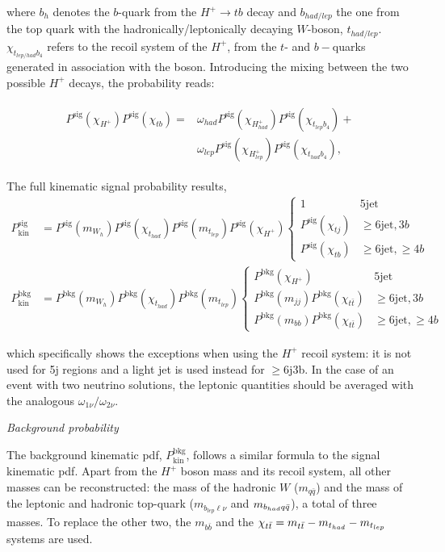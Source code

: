 where $b_h$ denotes the $b$-quark from the $H^+\to tb$ decay and $b_{had/lep}$ the one from the top quark with the hadronically/leptonically decaying $W$-boson, $t_{had/lep}$. $\chi_{t_{lep/had}b_4}$ refers to the recoil system of the $H^+$, from the $t$- and $b-$quarks generated in association with the boson.
Introducing the mixing between the two possible $H^+$ decays, the probability reads:

\begin{align}
    \begin{split}
        P^{\text{sig}}(\chi_{H^+})P^{\text{sig}}(\chi_{tb})=&\omega_{had}P^{\text{sig}}(\chi_{H^+_{had}})P^{\text{sig}}(\chi_{t_{lep}b_4})+\\
        &\omega_{lep}P^{\text{sig}}(\chi_{H^+_{lep}})P^{\text{sig}}(\chi_{t_{had}b_4}),
    \end{split}
\end{align}

The full kinematic signal probability results,
\begin{align}
    P_{\text{kin}}^{\text{sig}}&=P^{\text{sig}}(m_{W_h})P^{\text{sig}}(\chi_{t_{had}})P^{\text{sig}}(m_{t_{lep}})P^{\text{sig}}(\chi_{H^+})\begin{cases}1 & 5\text{jet} \\ P^{\text{sig}}(\chi_{tj})&\geq6\text{jet},3b\\P^{\text{sig}}(\chi_{tb})& \geq6\text{jet},\geq4b\end{cases}\\
     P_{\text{kin}}^{\text{bkg}}&=P^{\text{bkg}}(m_{W_h})P^{\text{bkg}}(\chi_{t_{had}})P^{\text{bkg}}(m_{t_{lep}})\begin{cases}P^{\text{bkg}}(\chi_{H^+}) & 5\text{jet} \\ P^{\text{bkg}}(m_{jj})P^{\text{bkg}}(\chi_{t\bar{t}})&\geq6\text{jet},3b\\P^{\text{bkg}}(m_{bb})P^{\text{bkg}}(\chi_{t\bar{t}})& \geq6\text{jet},\geq4b\end{cases}
\end{align}

which specifically shows the exceptions when using the $H^+$ recoil system: it is not used for 5j regions and a light jet is used instead for $\geq$6j3b.
In the case of an event with two neutrino solutions, the leptonic quantities should be averaged with the analogous $\omega_{1\nu}/\omega_{2\nu}$.


\textit{Background probability}

The background kinematic pdf, $P_{\text{kin}}^{\text{bkg}}$, follows a similar formula to the signal kinematic pdf. Apart from the $H^+$ boson mass and its recoil system, all other masses can be reconstructed: the mass of the hadronic $W$ ($m_{q\bar{q}}$) and the mass of the leptonic and hadronic top-quark ($m_{b_{lep}\ell\nu}$ and $m_{b_{had}q\Bar{q}}$), a total of three masses. To replace the other two, the $m_{b\bar{b}}$ and the $\chi_{t\bar{t}}=m_{t\bar{t}}-m_{t_{had}}-m_{t_{lep}}$ systems are used.

